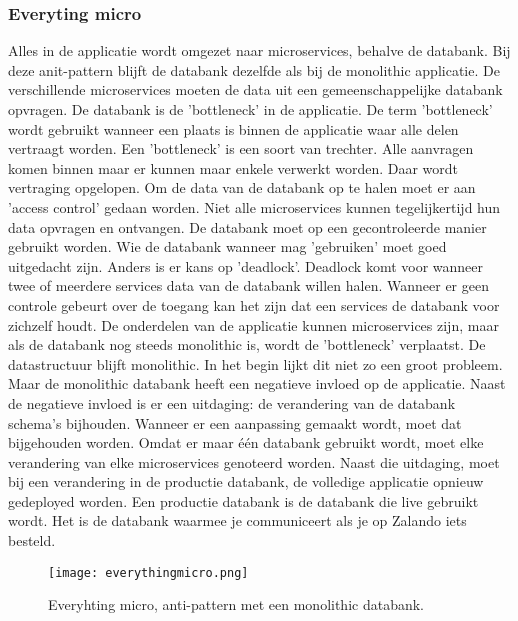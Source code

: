 \subsubsection{Everyting micro}
Alles in de applicatie wordt omgezet naar microservices, behalve de databank. Bij deze anit-pattern blijft de databank dezelfde als bij de monolithic applicatie. De verschillende microservices moeten de data uit een gemeenschappelijke databank opvragen. De databank is de 'bottleneck' in de applicatie. De term 'bottleneck' wordt gebruikt wanneer een plaats is binnen de applicatie waar alle delen vertraagt worden. Een 'bottleneck' is een soort van trechter. Alle aanvragen komen binnen maar er kunnen maar enkele verwerkt worden. Daar wordt vertraging opgelopen. 
Om de data van de databank op te halen moet er aan 'access control' gedaan worden. Niet alle microservices kunnen tegelijkertijd hun data opvragen en ontvangen. De databank moet op een gecontroleerde manier gebruikt worden. Wie de databank wanneer mag 'gebruiken' moet goed uitgedacht zijn. Anders is er kans op 'deadlock'. Deadlock komt voor wanneer twee of meerdere services data van de databank willen halen. Wanneer er geen controle gebeurt over de toegang kan het zijn dat een services de databank voor zichzelf houdt.
De onderdelen van de applicatie kunnen microservices zijn, maar als de databank nog steeds monolithic is, wordt de 'bottleneck' verplaatst.
De datastructuur blijft monolithic.
In het begin lijkt dit niet zo een groot probleem. Maar de monolithic databank heeft een negatieve invloed op de applicatie. Naast de negatieve invloed is er een uitdaging: de verandering van de databank schema's bijhouden. Wanneer er een aanpassing gemaakt wordt, moet dat bijgehouden worden. Omdat er maar één databank gebruikt wordt, moet elke verandering van elke microservices genoteerd worden. Naast die uitdaging, moet bij een verandering in de productie databank, de volledige applicatie opnieuw gedeployed worden. Een productie databank is de databank die live gebruikt wordt. Het is de databank waarmee je communiceert als je op Zalando iets besteld. 
\begin{figure}[h!]
	\texttt{[image: everythingmicro.png]}
	\centering
	\caption{Everyhting micro, anti-pattern met een monolithic databank. \textcite{Monson2019}}
\end{figure}

